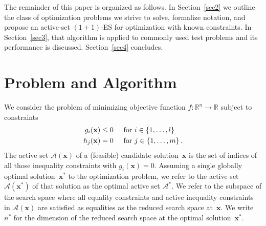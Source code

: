 \documentclass[oribibl]{llncs}
\newcommand{\x}{\ensuremath{\mathbf{x}}}
\begin{document}
The remainder of this paper is organized as follows. In Section~\ref{sec2} we outline the class of optimization problems we strive to solve, formalize notation, and propose an active-set $(1+1)$-ES for optimization with known constraints. In Section~\ref{sec3}, that algorithm is applied to commonly used test problems and its performance is discussed. Section~\ref{sec4} concludes.


\section{\label{sec2}Problem and Algorithm}




We consider the problem of minimizing objective function $f:\mathbb{R}^n\rightarrow\mathbb{R}$ subject to constraints
\begin{equation}\label{eq.constraints}
  \begin{split}
    g_i&(\x)\leq0\hspace{5mm}\text{for $i\in\{1,\dots,l\}$}\\
    h_j&(\x)=0\hspace{5mm}\text{for $j\in\{1,\dots,m\}$}\,.
  \end{split}
\end{equation}
The active set $\mathcal{A}(\x)$ of a (feasible) candidate solution~$\x$ is the set of indices of all those inequality constraints with $g_i(\x)=0$. Assuming a single globally optimal solution~$\x^*$ to the optimization problem, we refer to the active set~$\mathcal{A}(\x^*)$ of that solution as the optimal active set $\mathcal{A}^*$. We refer to the subspace of the search space where all equality constraints and active inequality constraints in $\mathcal{A}(\x)$ are satisfied as equalities as the reduced search space at~$\x$. We write $n^*$ for the dimension of the reduced search space at the optimal solution~$\x^*$.


 
\end{document}
